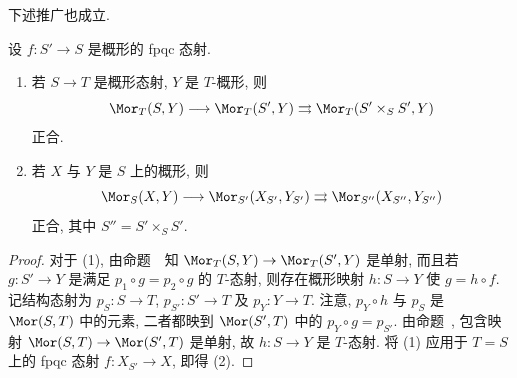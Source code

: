 下述推广也成立.
\begin{corollary}\label{src:3.1.10}
设 $f:S'\to S$ 是概形的 fpqc 态射.
\begin{enumerate}
\item 若 $S\to T$ 是概形态射, $Y$ 是 $T$-概形, 则
\[
\Mor_T(S,Y)\longrightarrow\Mor_T(S',Y)
\rightrightarrows\Mor_T(S'\times_S S',Y)
\]
正合.
\item 若 $X$ 与 $Y$ 是 $S$ 上的概形, 则
\[
\Mor_S(X,Y)\longrightarrow\Mor_{S'}(X_{S'},Y_{S'})
\rightrightarrows\Mor_{S''}(X_{S''},Y_{S''})
\]
正合, 其中 $S''=S'\times_S S'$.
\end{enumerate}
\end{corollary}
\begin{proof}
对于 (1), 由命题~~知 $\Mor_T(S,Y)\to\Mor_T(S',Y)$ 是单射, 而且若 $g:S'\to Y$ 是满足 $p_1\circ g=p_2\circ g$ 的 $T$-态射, 则存在概形映射 $h:S\to Y$ 使 $g=h\circ f$. 记结构态射为 $p_S:S\to T$, $p_{S'}:S'\to T$ 及 $p_Y:Y\to T$. 注意, $p_Y\circ h$ 与 $p_S$ 是 $\Mor(S,T)$ 中的元素, 二者都映到 $\Mor(S',T)$ 中的 $p_Y\circ g=p_{S'}$. 由命题~, 包含映射 $\Mor(S,T)\to\Mor(S',T)$ 是单射, 故 $h:S\to Y$ 是 $T$-态射. 将 (1) 应用于 $T=S$ 上的 fpqc 态射 $f:X_{S'}\to X$, 即得 (2).
\end{proof}
